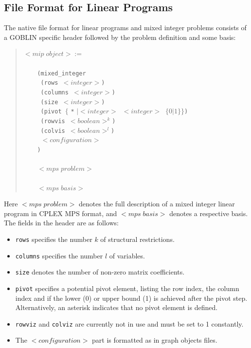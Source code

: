 \documentclass[a4paper,11pt,twoside]{book}
\begin{document}
\begin{multicols}{2}
\section{File Format for Linear Programs}
\label{slb_format_lp}
The native file format for linear programs and mixed integer problems consists
of a GOBLIN specific header followed by the problem definition and some basis:
\begin{quote}
$<mip\;object> :=$\verb/    /\\
\verb/    /\\
\verb/    (mixed_integer/ \\
\verb/     (rows /$<integer>$\verb/)/\\
\verb/     (columns /$<integer>$\verb/)/\\
\verb/     (size /$<integer>$\verb/)/\\
\verb/     (pivot /$\{$ \verb/*/ $| <integer>\;\;<integer>\;\;\{0|1\}\}$\verb/)/\\
\verb/     (rowvis /$<boolean>^k$\verb/)/\\
\verb/     (colvis /$<boolean>^l$\verb/)/\\
\verb/     /$<configuration>$\\
\verb!    )!\\
\verb!    !\\
\verb/    /$<mps\;problem>$\\
\verb!    !\\
\verb/    /$<mps\;basis>$\\
\end{quote}
Here $<mps\;problem>$ denotes the full description of a mixed integer linear
program in CPLEX MPS format, and $<mps\;basis>$ denotes a respective basis.
The fields in the header are as follows:
\begin{itemize}
\item \verb/rows/ specifies the number $k$ of structural restrictions.
\item \verb/columns/ specifies the number $l$ of variables.
\item \verb/size/ denotes the number of non-zero matrix coefficients.
\item \verb/pivot/ specifies a potential pivot element, listing the row index,
    the column index and if the lower (0) or upper bound (1) is achieved after
    the pivot step. Alternatively, an asterisk indicates that no pivot element
    is defined.
\item \verb/rowviz/ and \verb/colviz/ are currently not in use and must be
    set to 1 constantly.
\item The $<configuration>$ part is formatted as in graph objects files.
\end{itemize}




\end{multicols}
\end{document}

